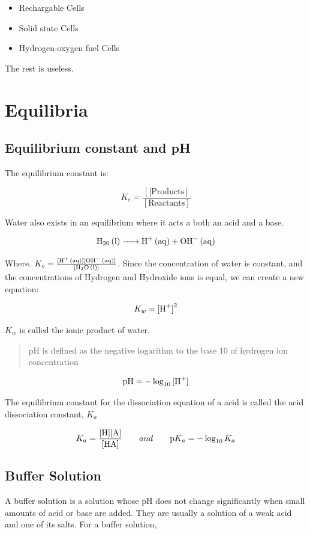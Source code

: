 \documentclass{scrbook}
\begin{document}
	\begin{itemize}
		\item
			Rechargable Cells
		\item
			Solid state Cells
		\item
			Hydrogen-oxygen fuel Cells
	\end{itemize}

	The rest is useless.

\chapter{Equilibria}

\section{Equilibrium constant and pH}

	The equilibrium constant is:

	\[ K_c = \frac{[\text{[Products}]}{[\text{Reactants}]} \]

	Water also exists in an equilibrium where it acts a both an acid and a base.

	
	\[ \ce{H20 (l) -> H+ (aq) + OH- (aq) } \]

	Where. $K_c = \frac{\ce{[H+ (aq)]}\ce{[OH- (aq)]}}{\ce{[H2O (l)]}}$. Since the concentration of water is constant, and the concentrations of Hydrogen and Hydroxide ions is equal, we can create a new equation:

	\[ K_w = \ce{[H+]}^2 \]

	$K_w$ is called the ionic product of water.

	\begin{quote}
		pH is defined as the negative logarithm to the base 10 of hydrogen ion concentration
	\end{quote}

	\[ \text{pH} = -\log_{10}\ce{[H+]} \]

	The equilibrium constant for the dissociation equation of a acid is called the acid dissociation constant, $K_a$

	\[ K_a = \frac{\ce{[H]}\ce{[A]}}{\ce{[HA]}} \qquad and \qquad \text{p}K_a = -\log_{10}K_a \]

\section{Buffer Solution}

	A buffer solution is a solution whose pH does not change significantly when small amounts of acid or base are added. They are usually a solution of a weak acid and one of its salts. For a buffer solution, 
\end{document}
